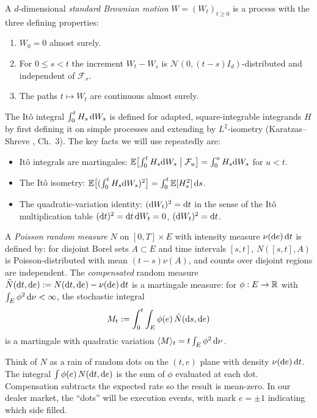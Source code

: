 A $d$-dimensional \emph{standard Brownian motion} $W = (W_t)_{t \geq 0}$ is a process with the three defining properties:
\begin{enumerate}[leftmargin=2em]
  \item $W_0 = 0$ almost surely.
  \item For $0 \leq s < t$ the increment $W_t - W_s$ is $\mathcal{N}(0, (t-s) I_d)$-distributed and independent of $\mathcal{F}_s$.
  \item The paths $t \mapsto W_t$ are continuous almost surely.
\end{enumerate}
The It\^o integral $\int_0^t H_s \, \mathrm{d} W_s$ is defined for adapted, square-integrable integrands $H$ by first defining it on simple processes and extending by $L^2$-isometry (Karatzas--Shreve \cite{karatzas1991}, Ch.~3). The key facts we will use repeatedly are:
\begin{itemize}[leftmargin=2em]
  \item It\^o integrals are martingales: $\mathbb{E}\bigl[\int_0^t H_s \mathrm{d} W_s \bigm| \mathcal{F}_u\bigr] = \int_0^u H_s \mathrm{d} W_s$ for $u < t$.
  \item The It\^o isometry: $\mathbb{E}\bigl[(\int_0^t H_s \mathrm{d} W_s)^2\bigr] = \int_0^t \mathbb{E}[H_s^2]\,\mathrm{d} s$.
  \item The quadratic-variation identity: $(\mathrm{d} W_t)^2 = \mathrm{d} t$ in the sense of the It\^o multiplication table $(\mathrm{d} t)^2 = \mathrm{d} t \, \mathrm{d} W_t = 0$, $(\mathrm{d} W_t)^2 = \mathrm{d} t$.
\end{itemize}

A \emph{Poisson random measure} $N$ on $[0,T] \times E$ with intensity measure $\nu(\mathrm{d} e)\,\mathrm{d} t$ is defined by: for disjoint Borel sets $A \subset E$ and time intervals $[s, t]$, $N([s, t], A)$ is Poisson-distributed with mean $(t - s)\nu(A)$, and counts over disjoint regions are independent. The \emph{compensated} random measure $\tilde N(\mathrm{d} t, \mathrm{d} e) := N(\mathrm{d} t, \mathrm{d} e) - \nu(\mathrm{d} e)\,\mathrm{d} t$ is a martingale measure: for $\phi : E \to \mathbb{R}$ with $\int_E \phi^2 \, \mathrm{d} \nu < \infty$, the stochastic integral
\begin{equation}
  M_t := \int_0^t \int_E \phi(e)\,\tilde N(\mathrm{d} s, \mathrm{d} e)
\end{equation}
is a martingale with quadratic variation $\langle M \rangle_t = t \int_E \phi^2 \, \mathrm{d} \nu$.

\begin{intuition}
Think of $N$ as a rain of random dots on the $(t, e)$ plane with density $\nu(\mathrm{d} e)\,\mathrm{d} t$. The integral $\int \phi(e) \, N(\mathrm{d} t, \mathrm{d} e)$ is the sum of $\phi$ evaluated at each dot. Compensation subtracts the expected rate so the result is mean-zero. In our dealer market, the ``dots'' will be execution events, with mark $e = \pm 1$ indicating which side filled.
\end{intuition}

